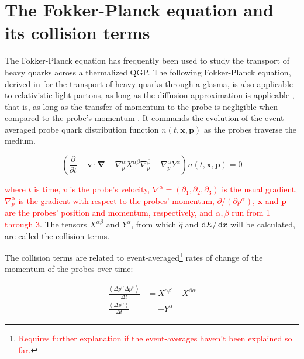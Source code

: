 \section{The Fokker-Planck equation and its collision terms}

The Fokker-Planck equation has frequently been used to study the transport of heavy quarks across a thermalized QGP. The following Fokker-Planck equation, derived in \cite{Mrowczynski:2017kso} for the transport of heavy quarks through a glasma, is also applicable to relativistic light partons, as long as the diffusion approximation is applicable \cite{Carrington:2022bnv}, that is, as long as the transfer of momentum to the probe is negligible when compared to the probe's momentum \cite{Mrowczynski:2017kso}. It commands the evolution of the event-averaged probe quark distribution function $n(t,\mathbf{x},\mathbf{p})$ as the probes traverse the medium.

\begin{equation}
	\left(\frac{\partial}{\partial t}
	+ \mathbf{v} \cdot \mathbf{\nabla}
	- \nabla^\alpha_p X^{\alpha \beta} \nabla^\beta_p
	- \nabla^\alpha_p Y^\alpha
	\right) n(t, \mathbf{x}, \mathbf{p}) = 0
\end{equation}

\noindent \textcolor{red}{where $t$ is time, $v$ is the probe's velocity, $\nabla^\alpha = (\partial_1, \partial_2, \partial_3)$ is the usual gradient, $\nabla_p^\alpha$ is the gradient with respect to the probes' momentum, $\partial/(\partial p^\alpha)$, $\mathbf{x}$ and $\mathbf{p}$ are the probes' position and momentum, respectively, and $\alpha,\beta$ run from 1 through 3}. The tensors $X^{\alpha\beta}$ and $Y^\alpha$, from which $\hat{q}$ and $\mathop{}\!\mathrm{d} E / \mathop{}\!\mathrm{d} x$ will be calculated, are called the collision terms.

The collision terms are related to event-averaged\textcolor{red}{\footnote{ \textcolor{red}{Requires further explanation if the event-averages haven't been explained so far.}}} rates of change of the momentum of the probes over time:

\begin{subequations}
	\begin{align}
		\frac{\left< \Delta p^\alpha \Delta p^\beta \right>}{\Delta t} &= X^{\alpha\beta} + X^{\beta\alpha} \label{eq:momentum_from_X}\\
		\frac{\left< \Delta p^\alpha \right>}{\Delta t} &= -Y^\alpha
	\end{align}
\end{subequations}

